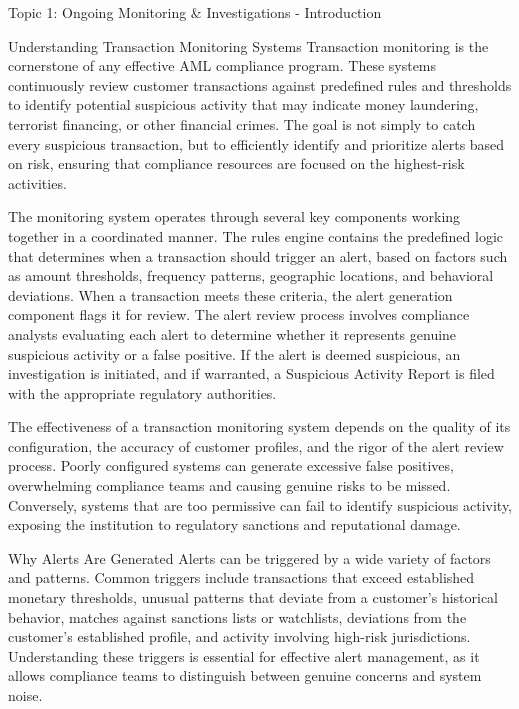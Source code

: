 \documentclass[8pt]{beamer}  %
\begin{document}
	\begin{frame}{Topic 1: Ongoing Monitoring \& Investigations - Introduction}
		\begin{block}{\large Understanding Transaction Monitoring Systems}
			Transaction monitoring is the cornerstone of any effective AML compliance program. These systems continuously review customer transactions against predefined rules and thresholds to identify potential suspicious activity that may indicate money laundering, terrorist financing, or other financial crimes. The goal is not simply to catch every suspicious transaction, but to efficiently identify and prioritize alerts based on risk, ensuring that compliance resources are focused on the highest-risk activities.
			
			The monitoring system operates through several key components working together in a coordinated manner. The rules engine contains the predefined logic that determines when a transaction should trigger an alert, based on factors such as amount thresholds, frequency patterns, geographic locations, and behavioral deviations. When a transaction meets these criteria, the alert generation component flags it for review. The alert review process involves compliance analysts evaluating each alert to determine whether it represents genuine suspicious activity or a false positive. If the alert is deemed suspicious, an investigation is initiated, and if warranted, a Suspicious Activity Report is filed with the appropriate regulatory authorities.
			
			The effectiveness of a transaction monitoring system depends on the quality of its configuration, the accuracy of customer profiles, and the rigor of the alert review process. Poorly configured systems can generate excessive false positives, overwhelming compliance teams and causing genuine risks to be missed. Conversely, systems that are too permissive can fail to identify suspicious activity, exposing the institution to regulatory sanctions and reputational damage.
		\end{block}
		
		\begin{block}{\large Why Alerts Are Generated}
			Alerts can be triggered by a wide variety of factors and patterns. Common triggers include transactions that exceed established monetary thresholds, unusual patterns that deviate from a customer's historical behavior, matches against sanctions lists or watchlists, deviations from the customer's established profile, and activity involving high-risk jurisdictions. Understanding these triggers is essential for effective alert management, as it allows compliance teams to distinguish between genuine concerns and system noise.
			

\end{block}
\end{frame}
\end{document}
